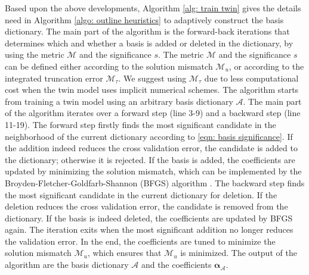Based upon the above developments, Algorithm \ref{alg: train twin} gives the details need in
Algorithm \ref{algo: outline heuristics} to adaptively construct the basis dictionary.
The main part of the algorithm is the forward-back iterations that
determines which and whether a basis is added or deleted 
in the dictionary, by using the metric $\mathcal{M}$ and the significance $s$.
The metric $\mathcal{M}$ and the significance $s$ can be defined either according to the
solution mismatch $\mathcal{M}_u$, or according to the integrated truncation error
$\mathcal{M}_{\tau}$. We suggest using $\mathcal{M}_{\tau}$ due to less computational cost 
when the twin model uses implicit numerical schemes.
The algorithm starts from training a twin model using 
an arbitrary basis dictionary $\mathcal{A}$. 
The main part of the algorithm iterates over a forward step (line 3-9) and a backward step (line
11-19). The forward step firstly finds the most significant candidate 
in the neighborhood of the current dictionary according to \eqref{eqn: basis significance}.
If the addition indeed reduces the cross validation error, the candidate is added 
to the dictionary; otherwise it is rejected. 
If the basis is added, the coefficients are updated by minimizing the solution mismatch, which can be
implemented by the Broyden-Fletcher-Goldfarb-Shannon (BFGS) algorithm \cite{quasiNewton}.
The backward step finds the most significant
candidate in the current dictionary for deletion. 
If the deletion reduces the cross validation error, the candidate
is removed from the dictionary. 
If the basis is indeed deleted, the coefficients are updated by BFGS again.
The iteration exits when the most significant addition no longer 
reduces the validation error. In the end, the 
coefficients are tuned to minimize the solution mismatch $\mathcal{M}_u$, which ensures that
$\mathcal{M}_u$ is minimized.
The output of the algorithm are the basis dictionary $\mathcal{A}$ and the
coefficients $\boldsymbol{\alpha}_{\mathcal{A}}$.\\



